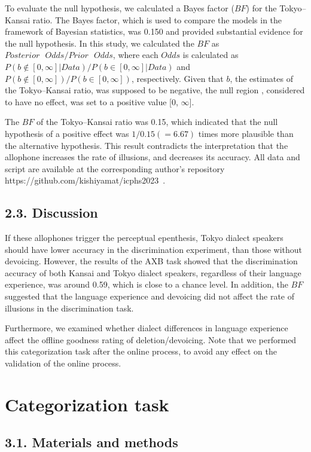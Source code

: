 \documentclass[a4paper,11pt,twocolumn]{article}
\begin{document}
To evaluate the null hypothesis, we calculated a Bayes factor ($BF$) for the Tokyo--Kansai ratio. The Bayes factor, which is used to compare the models in the framework of Bayesian statistics, was 0.150 and provided substantial evidence for the null hypothesis. In this study, we calculated the $BF$ as $Posterior \text{ }Odds / Prior \text{ }Odds$, where each $Odds$ is calculated as $P(b\notin[0, \infty] | Data)/P(b\in[0, \infty] | Data)$ and $P(b\notin[0, \infty])/P(b\in[0, \infty])$, respectively. Given that $b$, the estimates of the Tokyo--Kansai ratio, was supposed to be negative, the null region \cite{kruschke2010believe}, considered to have no effect, was set to a positive value [0, $\infty$].

The $BF$ of the Tokyo--Kansai ratio was 0.15, which indicated that the null hypothesis of a positive effect was $1/0.15(=6.67)$ times more plausible than the alternative hypothesis. This result contradicts the interpretation that the allophone increases the rate of illusions, and decreases its accuracy. All data and script are available at the corresponding author's repository https://github.com/kishiyamat/icphs2023~.

\subsection{2.3. Discussion}

If these allophones trigger the perceptual epenthesis, Tokyo dialect speakers should have lower accuracy in the discrimination experiment, than those without devoicing. However, the results of the AXB task showed that the discrimination accuracy of both Kansai and Tokyo dialect speakers, regardless of their language experience, was around 0.59, which is close to a chance level. In addition, the $BF$ suggested that the language experience and devoicing did not affect the rate of illusions in the discrimination task.

Furthermore, we examined whether dialect differences in language experience affect the offline goodness rating of deletion/devoicing. Note that we performed this categorization task after the online process, to avoid any effect on the validation of the online process.

\section{Categorization task}

\subsection{3.1. Materials and methods}
\end{document}
